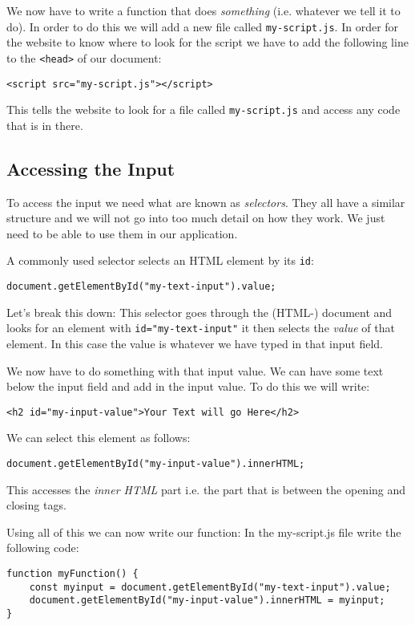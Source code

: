 \documentclass[english,11pt,a4paper]{report}
\begin{document}
We now have to write a function that does \emph{something} (i.e. whatever we tell it to do). In order to do this we will add a new file called \verb|my-script.js|.  In order for the website to know where to look for the script we have to add the following line to the \verb|<head>| of our document:
\begin{verbatim}
<script src="my-script.js"></script>
\end{verbatim}
This tells the website to look for a file called \verb|my-script.js| and access any code that is in there.

\subsection{Accessing the Input}

To access the input we need what are known as \emph{selectors}. They all have a similar structure and we will not go into too much detail on how they work. We just need to be able to use them in our application.

A commonly used selector selects an HTML element by its \verb|id|: 
\begin{verbatim}
document.getElementById("my-text-input").value;
\end{verbatim}
Let's break this down: This selector goes through the (HTML-) document and looks for an element with \verb|id="my-text-input"| it then selects the \emph{value} of that element. In this case the value is whatever we have typed in that input field.

We now have to do something with that input value. We can have some text below the input field and  add in the input value. To do this we will write:
\begin{verbatim}
<h2 id="my-input-value">Your Text will go Here</h2>
\end{verbatim}
We can select this element as follows:
\begin{verbatim}
document.getElementById("my-input-value").innerHTML;
\end{verbatim}
This accesses the \emph{inner HTML} part i.e. the part that is between the opening and closing tags.

Using all of this we can now write our function: In the my-script.js file write the following code:
\begin{verbatim}
function myFunction() {
    const myinput = document.getElementById("my-text-input").value;
    document.getElementById("my-input-value").innerHTML = myinput;
}
\end{verbatim}
\end{document}
